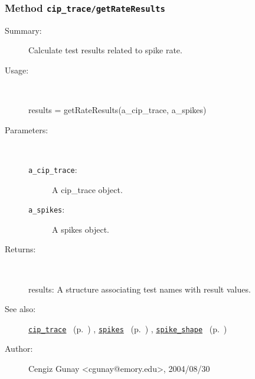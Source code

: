 \subsubsection[Method \texttt{getRateResults}]{Method \texttt{cip\_trace/getRateResults}}%
%
\label{ref_cip_trace__getRateResults}%
\hypertarget{ref_cip_trace__getRateResults}{}%
\begin{description}
\item[Summary:]Calculate test results related to spike rate.
%
\item[Usage:]~%
\begin{lyxcode}%
results = getRateResults(a\_cip\_trace, a\_spikes)
%
\end{lyxcode}%
%
%
\item[Parameters:]~
\begin{description}%
\item[\texttt{a\_cip\_trace}:]
 A cip\_trace object.
\item[\texttt{a\_spikes}:]
 A spikes object.
\end{description}%
%
\item[Returns:
]~

	results: A structure associating test names with result values.
%
%
\item[See also:]%
\hyperlink{ref_cip_trace}{\texttt{cip\_trace}}%
\ (p.~\pageref{ref_cip_trace})%
%
, \hyperlink{ref_spikes}{\texttt{spikes}}%
\ (p.~\pageref{ref_spikes})%
%
, \hyperlink{ref_spike_shape}{\texttt{spike\_shape}}%
\ (p.~\pageref{ref_spike_shape})%
%
%
\item[Author:]%
Cengiz Gunay <cgunay@emory.edu>, 2004/08/30
%
\end{description}
\methodline%
